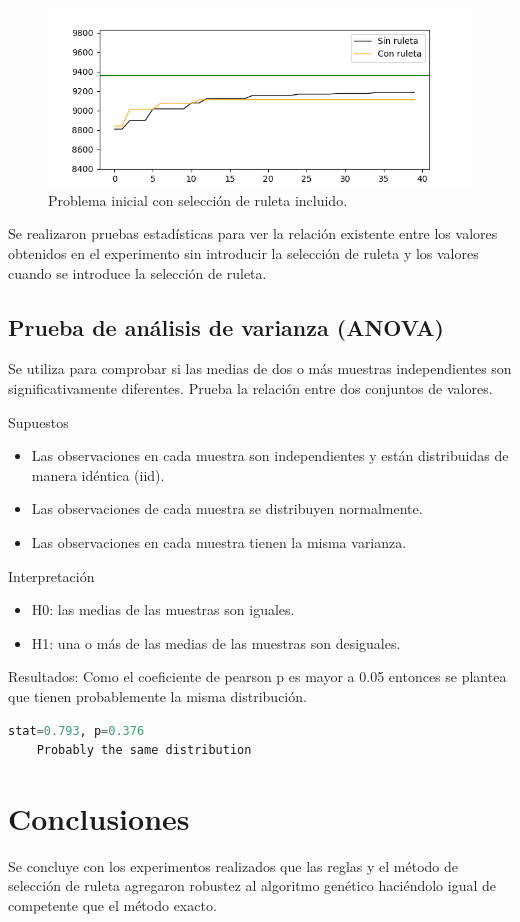 \documentclass{article}
\begin{document}
\begin{figure}[H]
	\centering
	\includegraphics[scale=0.8]{Figure_2.png}
	\caption{Problema inicial con selección de ruleta incluido.}
	\label{1}		
\end{figure} 

Se realizaron pruebas estadísticas \cite{jason} para ver la relación existente entre los valores obtenidos en el experimento sin introducir la selección de ruleta y los valores cuando se introduce la selección de ruleta.

\subsection{Prueba de análisis de varianza (ANOVA)}
Se utiliza para comprobar si las medias de dos o más muestras independientes son significativamente diferentes. Prueba la relación  entre dos conjuntos de valores.

Supuestos
\begin{itemize}
	\item Las observaciones en cada muestra son independientes y están distribuidas de manera idéntica (iid).
	\item Las observaciones de cada muestra se distribuyen normalmente.
	\item Las observaciones en cada muestra tienen la misma varianza.
\end{itemize}

Interpretación
\begin{itemize}
	\item H0: las medias de las muestras son iguales.
	\item H1: una o más de las medias de las muestras son desiguales.
\end{itemize}

Resultados: Como el coeficiente de pearson p es mayor a 0.05 entonces se plantea que tienen probablemente la misma distribución.

\begin{lstlisting}[language=Python]
	stat=0.793, p=0.376
	Probably the same distribution
\end{lstlisting}


\section{Conclusiones}
Se concluye con los experimentos realizados que las reglas y el método de selección de ruleta agregaron robustez al algoritmo genético haciéndolo igual de competente que el método exacto. 



\end{document}
